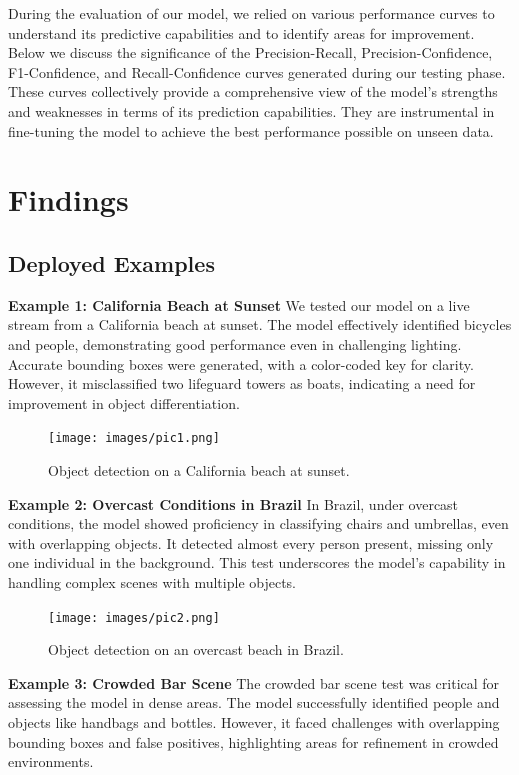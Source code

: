 \documentclass[10pt]{extarticle}
\begin{document}
During the evaluation of our model, we relied on various performance curves to understand its predictive capabilities and to identify areas for improvement. Below we discuss the significance of the Precision-Recall, Precision-Confidence, F1-Confidence, and Recall-Confidence curves generated during our testing phase. These curves collectively provide a comprehensive view of the model's strengths and weaknesses in terms of its prediction capabilities. They are instrumental in fine-tuning the model to achieve the best performance possible on unseen data.

\section{Findings}

\subsection{Deployed Examples}

\textbf{Example 1: California Beach at Sunset}
We tested our model on a live stream from a California beach at sunset. The model effectively identified bicycles and people, demonstrating good performance even in challenging lighting. Accurate bounding boxes were generated, with a color-coded key for clarity. However, it misclassified two lifeguard towers as boats, indicating a need for improvement in object differentiation.

\begin{figure}[H]
\centering
\texttt{[image: images/pic1.png]}
\caption{Object detection on a California beach at sunset.}
\end{figure}

\textbf{Example 2: Overcast Conditions in Brazil}
In Brazil, under overcast conditions, the model showed proficiency in classifying chairs and umbrellas, even with overlapping objects. It detected almost every person present, missing only one individual in the background. This test underscores the model's capability in handling complex scenes with multiple objects.

\begin{figure}[H]
\centering
\texttt{[image: images/pic2.png]}
\caption{Object detection on an overcast beach in Brazil.}
\end{figure}

\textbf{Example 3: Crowded Bar Scene}
The crowded bar scene test was critical for assessing the model in dense areas. The model successfully identified people and objects like handbags and bottles. However, it faced challenges with overlapping bounding boxes and false positives, highlighting areas for refinement in crowded environments.
\end{document}

